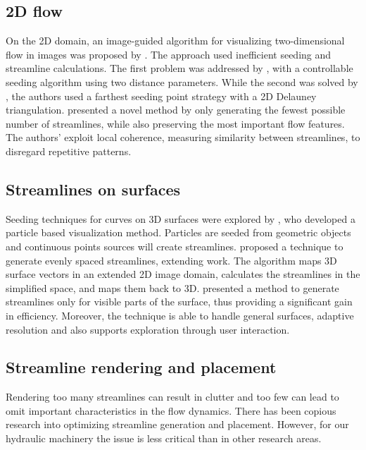 \subsection{2D flow}

On the 2D domain, an image-guided algorithm for visualizing two-dimensional flow in images was proposed by \cite{Turk1996}.
The approach used inefficient seeding and streamline calculations.
The first problem was addressed by \cite{Jobard1997}, with a controllable seeding algorithm using two distance parameters.
While the second was solved by \cite{Mebarki2005}, the authors used a farthest seeding point strategy with a 2D Delauney triangulation.
\cite{Li2008} presented a novel method by only generating the fewest possible number of streamlines, while also preserving the most important flow features.
The authors' exploit local coherence,  measuring similarity between streamlines, to disregard repetitive patterns.

\subsection{Streamlines on surfaces}

Seeding techniques for curves on 3D surfaces were explored by \cite{VanWijk1992}, who developed a particle based visualization method.
Particles are seeded from geometric objects and continuous points sources will create streamlines.
\cite{Mao1998} proposed a technique to generate evenly spaced streamlines, extending \cite{Turk1996} work.
The algorithm maps 3D surface vectors in an extended 2D image domain, calculates the streamlines in the simplified space, and maps them back to 3D. 
\cite{Spencer2009} presented a method to generate streamlines only for visible parts of the surface, thus providing a significant gain in efficiency.
Moreover, the technique is able to handle general surfaces, adaptive resolution and also supports exploration through user interaction.

\subsection{Streamline rendering and placement}

Rendering too many streamlines can result in clutter and too few can lead to omit important characteristics in the flow dynamics.
There has been copious research into optimizing streamline generation and placement.
However, for our hydraulic machinery the issue is less critical than in other research areas.

